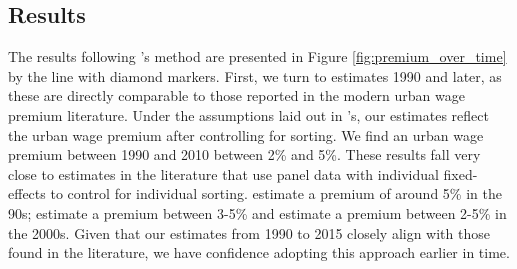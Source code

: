 \documentclass[12pt,twoside]{article}
\begin{document}


\subsection{Results}

The results following \citet{altonji2018estimating}'s method are presented in Figure \ref{fig:premium_over_time} by the line with diamond markers. 
First, we turn to estimates 1990 and later, as these are directly comparable to those reported in the modern urban wage premium literature.  
Under the assumptions laid out in \citet{altonji2018estimating}'s, our estimates reflect the urban wage premium after controlling for sorting. 
We find an urban wage premium between 1990 and 2010 between 2\% and 5\%. 
These results fall very close to estimates in the literature that use panel data with individual fixed-effects to control for individual sorting. 
\citet{Glaeser_Mare_2001} estimate a premium of around 5\% in the 90s; \citet{Yankow_2006} estimate a premium between 3-5\% and \citet{DCosta_Overman_2014} estimate a premium between 2-5\% in the 2000s. 
Given that our estimates from 1990 to 2015 closely align with those found in the literature, we have confidence adopting this approach earlier in time. 
\end{document}
